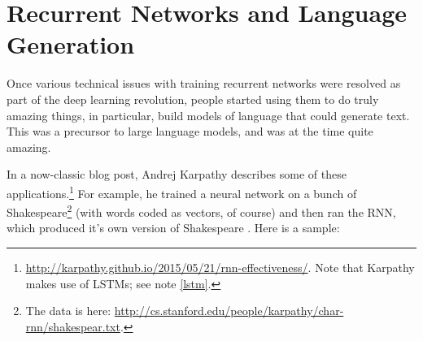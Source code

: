 
\section{Recurrent Networks and Language Generation}\label{languageModelsRecurrent}

Once various technical issues with training recurrent networks were resolved as part of the deep learning revolution, people started using them to do truly amazing things, in particular, build models of language that could generate text. This was a precursor to large language models, and was at the time quite amazing.

In a now-classic blog post, Andrej Karpathy describes some of these applications.\footnote{\url{http://karpathy.github.io/2015/05/21/rnn-effectiveness/}. Note that Karpathy makes use of LSTMs; see note \ref{lstm}.}  For example, he trained a neural network on a bunch of Shakespeare\footnote{The data is here: \url{http://cs.stanford.edu/people/karpathy/char-rnn/shakespear.txt}.}  (with words coded as vectors, of course) and then ran the RNN, which produced it's own version of Shakespeare \cite{karpathy2015unreasonable}. Here is a sample:

